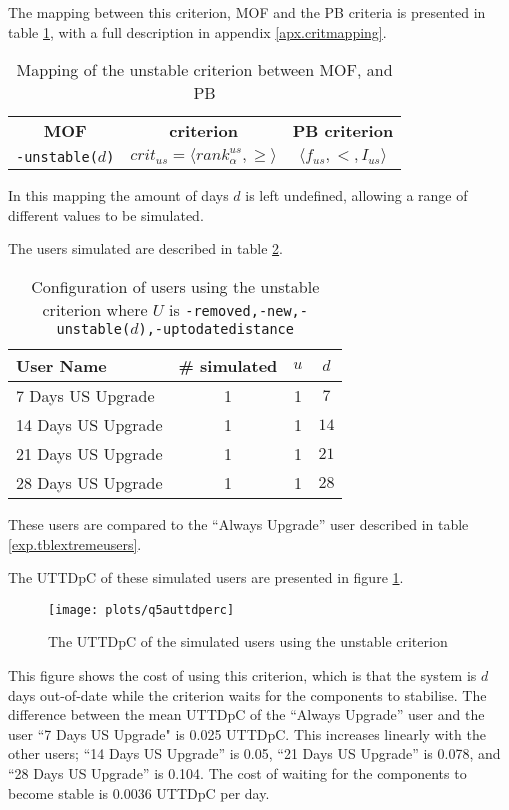 The mapping between this criterion, MOF and the PB criteria is presented in table \ref{exp.stablcritmapping}, with a full description in appendix \ref{apx.critmapping}.
\begin{table}[h!]
\centering
\begin{tabular}{c | c | c}
\textbf{MOF} 		& \textbf{\modelname criterion} & \textbf{PB criterion} \\
\texttt{-unstable(}$d$\texttt{)} & $crit_{us} = \langle rank^{us}_{\alpha}, \geq \rangle$ & $\langle f_{us}, <, I_{us} \rangle$ \\
\end{tabular}
\caption{Mapping of the unstable criterion between MOF, \modelname and PB}
\label{exp.stablcritmapping}
\end{table}
In this mapping the amount of days $d$ is left undefined, allowing a range of different values to be simulated.

The users simulated are described in table \ref{exp.tblsvusers}.
\begin{table}[h!]
\centering
\begin{tabular}{|l | c | c | c| }
\hline
User Name 				& \# simulated 	& $u$ 	& $d$ 			\\ \hline
7 Days US Upgrade		& 1 			& 1 & 	$7$		 \\
14 Days US Upgrade		& 1 			& 1 & 	$14$			\\
21 Days US Upgrade		& 1 			& 1 & 	$21$			 \\
28 Days US Upgrade 		& 1 			& 1 & 	$28$			\\ \hline
\end{tabular}
\caption[Configuration of users using the unstable criterion]{Configuration of users using the unstable criterion 
where $U$ is \texttt{-removed,-new,-unstable(}$d$\texttt{),-uptodatedistance}}
\label{exp.tblsvusers}
\end{table}
These users are compared to the ``Always Upgrade'' user described in table \ref{exp.tblextremeusers}.

The UTTDpC of these simulated users are presented in figure \ref{exp.q5auttdperc}.
\begin{figure}[htp]
\begin{center}
  \texttt{[image: plots/q5auttdperc]}
  \caption{The UTTDpC of the simulated users using the unstable criterion}
  \label{exp.q5auttdperc}
\end{center}
\end{figure}

This figure shows the cost of using this criterion, which is that the system is $d$ days out-of-date while the criterion waits for the components to stabilise.
The difference between the mean UTTDpC of the ``Always Upgrade'' user and the user ``7 Days US Upgrade" is 0.025 UTTDpC.
This increases linearly with the other users; ``14 Days US Upgrade'' is 0.05, ``21 Days US Upgrade'' is 0.078, and ``28 Days US Upgrade'' is 0.104.
The cost of waiting for the components to become stable is 0.0036 UTTDpC per day.

